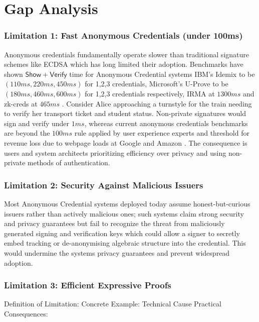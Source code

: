 \section{Gap Analysis}

\subsubsection{Limitation 1: Fast Anonymous Credentials (under 100ms) }

Anonymous credentials fundamentally operate slower than traditional signature schemes like ECDSA which has long limited their adoption. Benchmarks \cite{habib_evaluation_2016} have shown $\mathsf{Show + Verify}$ time for Anonymous Credential systems IBM's Idemix to be $(110ms, 220ms, 450ms)$ for 1,2,3 credentials, Microsoft's U-Prove to be $(180ms, 460ms, 600ms)$ for 1,2,3 credentials respectively, IRMA \cite{fischer-hubner_towards_2013} at $1300ms$ and zk-creds at $465ms$ \cite{rosenberg_zk-creds_2022}. Consider Alice approaching a turnstyle for the train needing to verify her transport ticket and student status. Non-private signatures would sign and verify under $1ms$, whereas current anonymous credentials benchmarks are beyond the $100ms$ rule applied by user experience experts \cite{jakob_nielsen_powers_2009} and threshold for revenue loss due to webpage loads at Google and Amazon \cite{linden_geeking_2006}. The consequence is users and system architects prioritizing efficiency over privacy and using non-private methods of authentication. 


\subsubsection{Limitation 2: Security Against Malicious Issuers}
Most Anonymous Credential systems deployed today assume honest-but-curious issuers rather than actively malicious ones; such systems claim strong security and privacy guarantees but fail to recognize the threat from maliciously generated signing and verification keys which could allow a signer to secretly embed tracking or de-anonymising algebraic structure into the credential. This would undermine the systems privacy guarantees and prevent widespread adoption. 


\subsubsection{Limitation 3: Efficient Expressive Proofs}
Definition of Limitation: 
Concrete Example:
Technical Cause
Practical Consequences:


